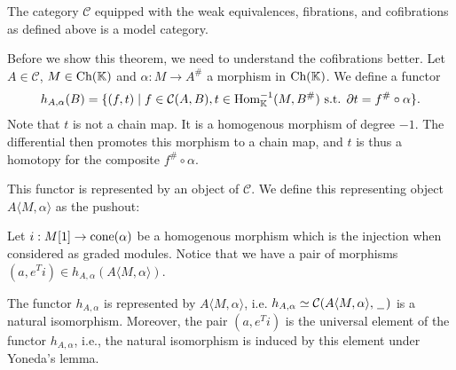 \documentclass[../thesis.tex]{subfiles}
\begin{document}
            \begin{thm}\label{thm: model-str-alg}
                The category $\mathcal{C}$ equipped with the weak equivalences, fibrations, and cofibrations as defined above is a model category.
            \end{thm}

            Before we show this theorem, we need to understand the cofibrations better. Let $A\in\mathcal{C}$, $M\in \tt{Ch}(\mathbb{K})$ and $\alpha : M \rightarrow A^\#$ a morphism in $\tt{Ch}(\mathbb{K})$. We define a functor 
            \begin{align*}
                h_{A,\alpha}(B) = \startset{(f,t)\mid f\in \mathcal{C}(A,B), t\in \tt{Hom}^{-1}_\mathbb{K}(M, B^\#) \tt{ s.t. } \partial t = f^\#\circ\alpha}.
            \end{align*}
            Note that $t$ is not a chain map. It is a homogenous morphism of degree $-1$. The differential then promotes this morphism to a chain map, and $t$ is thus a homotopy for the composite $f^\#\circ\alpha$.

            This functor is represented by an object of $\mathcal{C}$. We define this representing object $A\langle M, \alpha\rangle$ as the pushout:
            \begin{center}
            \end{center}
            Let $i: M[1] \rightarrow \tt{cone}(\alpha)$ be a homogenous morphism which is the injection when considered as graded modules. Notice that we have a pair of morphisms $(a, e^Ti)\in h_{A,\alpha}(A\langle M,\alpha\rangle)$.
                
            \begin{proposition}\label{prop: universal-h}
                The functor $h_{A,\alpha}$ is represented by $A\langle M,\alpha\rangle$, i.e. $h_{A,\alpha}\simeq \mathcal{C}(A\langle M,\alpha\rangle,\argument)$ is a natural isomorphism. Moreover, the pair $(a, e^Ti)$ is the universal element of the functor $h_{A,\alpha}$, i.e., the natural isomorphism is induced by this element under Yoneda's lemma.
            \end{proposition}
\end{document}
